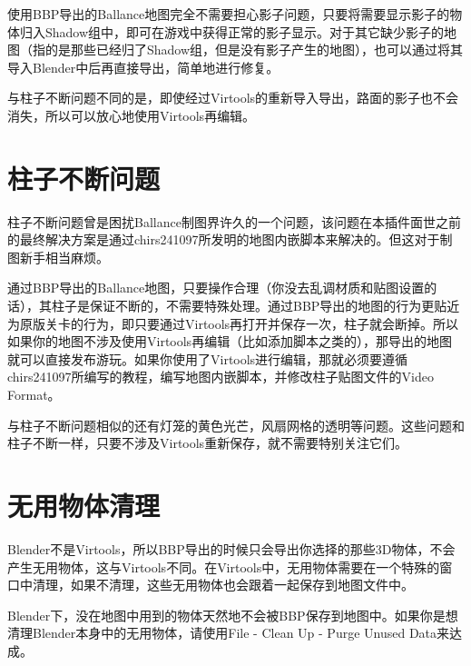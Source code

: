 使用BBP导出的Ballance地图完全不需要担心影子问题，只要将需要显示影子的物体归入Shadow组中，即可在游戏中获得正常的影子显示。对于其它缺少影子的地图（指的是那些已经归了Shadow组，但是没有影子产生的地图），也可以通过将其导入Blender中后再直接导出，简单地进行修复。

与柱子不断问题不同的是，即使经过Virtools的重新导入导出，路面的影子也不会消失，所以可以放心地使用Virtools再编辑。

\section{柱子不断问题}

柱子不断问题曾是困扰Ballance制图界许久的一个问题，该问题在本插件面世之前的最终解决方案是通过chirs241097所发明的地图内嵌脚本来解决的。但这对于制图新手相当麻烦。

通过BBP导出的Ballance地图，只要操作合理（你没去乱调材质和贴图设置的话），其柱子是保证不断的，不需要特殊处理。通过BBP导出的地图的行为更贴近为原版关卡的行为，即只要通过Virtools再打开并保存一次，柱子就会断掉。所以如果你的地图不涉及使用Virtools再编辑（比如添加脚本之类的），那导出的地图就可以直接发布游玩。如果你使用了Virtools进行编辑，那就必须要遵循chirs241097所编写的教程，编写地图内嵌脚本，并修改柱子贴图文件的Video Format。

与柱子不断问题相似的还有灯笼的黄色光芒，风扇网格的透明等问题。这些问题和柱子不断一样，只要不涉及Virtools重新保存，就不需要特别关注它们。

\section{无用物体清理}

Blender不是Virtools，所以BBP导出的时候只会导出你选择的那些3D物体，不会产生无用物体，这与Virtools不同。在Virtools中，无用物体需要在一个特殊的窗口中清理，如果不清理，这些无用物体也会跟着一起保存到地图文件中。

Blender下，没在地图中用到的物体天然地不会被BBP保存到地图中。如果你是想清理Blender本身中的无用物体，请使用File - Clean Up - Purge Unused Data来达成。
